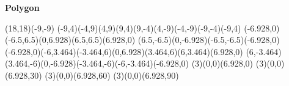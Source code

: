 


\begin{center}
{\Huge\bf{Polygon}}
\bigskip

\begin{lapdf}(18,18)(-9,-9)
 \Dgray
 \Polygon(-9,4)(-4,9)(4,9)(9,4)(9,-4)(4,-9)(-4,-9)(-9,-4)(-9,4) \Stroke
 \Red
 \Polygon(-6.928,0)(-6.5,6.5)(0,6.928)(6.5,6.5)(6.928,0)
  (6.5,-6.5)(0,-6.928)(-6.5,-6.5)(-6.928,0) \Stroke
 \Green
 \Polygon(-6.928,0)(-6,3.464)(-3.464,6)(0,6.928)(3.464,6)(6,3.464)(6.928,0)
  (6,-3.464)(3.464,-6)(0,-6.928)(-3.464,-6)(-6,-3.464)(-6.928,0) \Stroke
 \Blue
 \Epolygon(3)(0,0)(6.928,0) \Stroke
 \Cyan
 \Epolygon(3)(0,0)(6.928,30) \Stroke
 \Magenta
 \Epolygon(3)(0,0)(6.928,60) \Stroke
 \Yellow
 \Epolygon(3)(0,0)(6.928,90) \Stroke
\end{lapdf}
\end{center}

